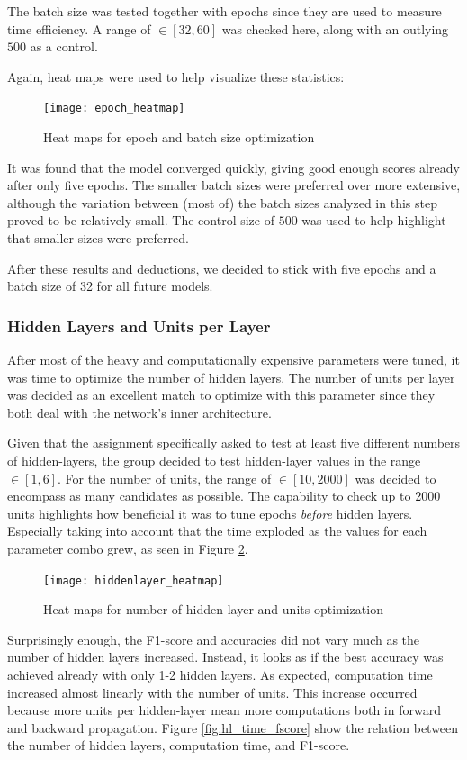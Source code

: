 The batch size was tested together with epochs since they are used to measure time efficiency. A range of $\in[32, 60]$ was checked here, along with an outlying $500$ as a control.

Again, heat maps were used to help visualize these statistics:

\begin{figure}[H]
\centering
\texttt{[image: epoch\_heatmap]}
\caption{Heat maps for epoch and batch size optimization}
\label{fig:epoch_heatmap}
\end{figure}

It was found that the model converged quickly, giving good enough scores already after only five epochs. The smaller batch sizes were preferred over more extensive, although the variation between (most of) the batch sizes analyzed in this step proved to be relatively small. The control size of $500$ was used to help highlight that smaller sizes were preferred. 

After these results and deductions, we decided to stick with five epochs and a batch size of 32 for all future models.

\subsubsection{Hidden Layers and Units per Layer}
\quad After most of the heavy and computationally expensive parameters were tuned, it was time to optimize the number of hidden layers. The number of units per layer was decided as an excellent match to optimize with this parameter since they both deal with the network's inner architecture.

Given that the assignment specifically asked to test at least five different numbers of hidden-layers, the group decided to test hidden-layer values in the range $\in[1, 6]$. For the number of units, the range of $\in[10, 2000]$ was decided to encompass as many candidates as possible. The capability to check up to 2000 units highlights how beneficial it was to tune epochs \textit{before} hidden layers. Especially taking into account that the time exploded as the values for each parameter combo grew, as seen in Figure \ref{fig:hlu_heatmap}.

\begin{figure}[H]
\centering
\texttt{[image: hiddenlayer\_heatmap]}
\caption{Heat maps for number of hidden layer and units optimization}
\label{fig:hlu_heatmap}
\end{figure}

Surprisingly enough, the F1-score and accuracies did not vary much as the number of hidden layers increased. Instead, it looks as if the best accuracy was achieved already with only 1-2 hidden layers. As expected, computation time increased almost linearly with the number of units. This increase occurred because more units per hidden-layer mean more computations both in forward and backward propagation. Figure \ref{fig:hl_time_fscore} show the relation between the number of hidden layers, computation time, and F1-score.

